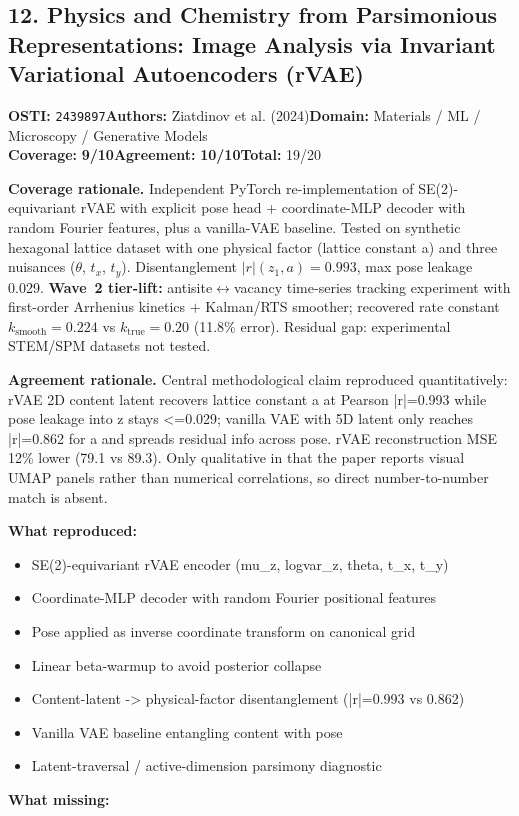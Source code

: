 \documentclass[11pt]{article}
\newcommand{\scorebadge}[2]{\textbf{#1:} \textbf{#2/10}}
\begin{document}
\subsection{12. Physics and Chemistry from Parsimonious Representations: Image Analysis via Invariant Variational Autoencoders (rVAE)}
\textbf{OSTI:} \texttt{2439897}\quad\textbf{Authors:} Ziatdinov et al. (2024)\quad\textbf{Domain:} Materials / ML / Microscopy / Generative Models\\
\scorebadge{Coverage}{9}\quad\scorebadge{Agreement}{10}\quad\textbf{Total:} 19/20\par\smallskip
\noindent\textbf{Coverage rationale.} Independent PyTorch re-implementation of SE(2)-equivariant rVAE with explicit pose head + coordinate-MLP decoder with random Fourier features, plus a vanilla-VAE baseline. Tested on synthetic hexagonal lattice dataset with one physical factor (lattice constant a) and three nuisances ($\theta$, $t_x$, $t_y$). Disentanglement $|r|(z_1, a)=0.993$, max pose leakage 0.029. \textbf{Wave~2 tier-lift:} antisite$\leftrightarrow$vacancy time-series tracking experiment with first-order Arrhenius kinetics $+$ Kalman/RTS smoother; recovered rate constant $k_{\mathrm{smooth}}=0.224$ vs $k_{\mathrm{true}}=0.20$ (11.8\% error). Residual gap: experimental STEM/SPM datasets not tested.\par
\noindent\textbf{Agreement rationale.} Central methodological claim reproduced quantitatively: rVAE 2D content latent recovers lattice constant a at Pearson |r|=0.993 while pose leakage into z stays \textless{}=0.029; vanilla VAE with 5D latent only reaches |r|=0.862 for a and spreads residual info across pose. rVAE reconstruction MSE 12\% lower (79.1 vs 89.3). Only qualitative in that the paper reports visual UMAP panels rather than numerical correlations, so direct number-to-number match is absent.\par\smallskip
\noindent\textbf{What reproduced:}
\begin{itemize}[leftmargin=1.4em,itemsep=0.2em,topsep=0.2em]
\item SE(2)-equivariant rVAE encoder (mu\_z, logvar\_z, theta, t\_x, t\_y)
\item Coordinate-MLP decoder with random Fourier positional features
\item Pose applied as inverse coordinate transform on canonical grid
\item Linear beta-warmup to avoid posterior collapse
\item Content-latent -\textgreater{} physical-factor disentanglement (|r|=0.993 vs 0.862)
\item Vanilla VAE baseline entangling content with pose
\item Latent-traversal / active-dimension parsimony diagnostic
\end{itemize}\noindent\textbf{What missing:}
\end{document}

